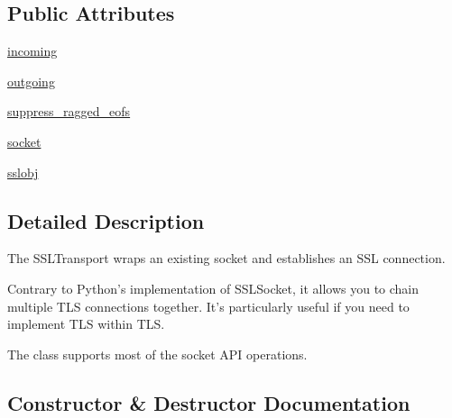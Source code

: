 \subsection*{Public Attributes}
\begin{DoxyCompactItemize}
\item 
\hyperlink{classpip_1_1__vendor_1_1urllib3_1_1util_1_1ssltransport_1_1SSLTransport_a2c51a0790d6c4c643dc5e3b5174b16b9}{incoming}
\item 
\hyperlink{classpip_1_1__vendor_1_1urllib3_1_1util_1_1ssltransport_1_1SSLTransport_a998a65bd0298bf0fde6d0b77d3a484eb}{outgoing}
\item 
\hyperlink{classpip_1_1__vendor_1_1urllib3_1_1util_1_1ssltransport_1_1SSLTransport_a50799ec6ecdc2f1cb81001e1d9fb1fdc}{suppress\+\_\+ragged\+\_\+eofs}
\item 
\hyperlink{classpip_1_1__vendor_1_1urllib3_1_1util_1_1ssltransport_1_1SSLTransport_a9640a56b99ad65bcfa066db295828c16}{socket}
\item 
\hyperlink{classpip_1_1__vendor_1_1urllib3_1_1util_1_1ssltransport_1_1SSLTransport_ae6ad16f0b3958ddb9430e7542afbe7b7}{sslobj}
\end{DoxyCompactItemize}


\subsection{Detailed Description}
\begin{DoxyVerb}The SSLTransport wraps an existing socket and establishes an SSL connection.

Contrary to Python's implementation of SSLSocket, it allows you to chain
multiple TLS connections together. It's particularly useful if you need to
implement TLS within TLS.

The class supports most of the socket API operations.
\end{DoxyVerb}
 

\subsection{Constructor \& Destructor Documentation}
\mbox{\label{classpip_1_1__vendor_1_1urllib3_1_1util_1_1ssltransport_1_1SSLTransport_a732f5816c7be7853f2549ffabbfdc1df}} 
